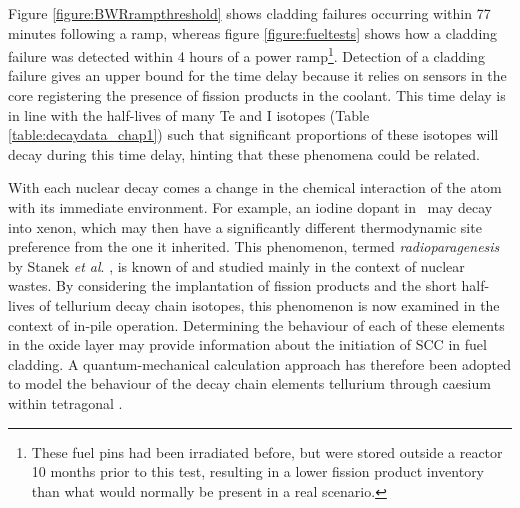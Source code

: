 Figure \ref{figure:BWRrampthreshold} shows cladding failures occurring within 77 minutes following a ramp, whereas figure \ref{figure:fueltests} shows how a cladding failure was detected within 4 hours of a power ramp\footnote{These fuel pins had been irradiated before, but were stored outside a reactor 10 months prior to this test, resulting in a lower fission product inventory than what would normally be present in a real scenario.}. Detection of a cladding failure gives an upper bound for the time delay because it relies on sensors in the core registering the presence of fission products in the coolant. This time delay is in line with the half-lives of many Te and I isotopes (Table \ref{table:decaydata_chap1}) such that significant proportions of these isotopes will decay during this time delay, hinting that these phenomena could be related. 

With each nuclear decay comes a change in the chemical interaction of the atom with its immediate environment. For example, an iodine dopant in \zirconia\ may decay into xenon, which may then have a significantly different thermodynamic site preference from the one it inherited. This phenomenon, termed \emph{radioparagenesis} by Stanek \emph{et al}. \cite{stanek2010radioparagenesis, Jiang2010, jiang2010radioparagenesis}, is known of and studied mainly in the context of nuclear wastes. By considering the implantation of fission products and the short half-lives of tellurium decay chain isotopes, this phenomenon is now examined in the context of in-pile operation. Determining the behaviour of each of these elements in the oxide layer may provide information about the initiation of SCC in fuel cladding. A quantum-mechanical calculation approach has therefore been adopted to model the behaviour of the decay chain elements tellurium through caesium within tetragonal \zirconia.

